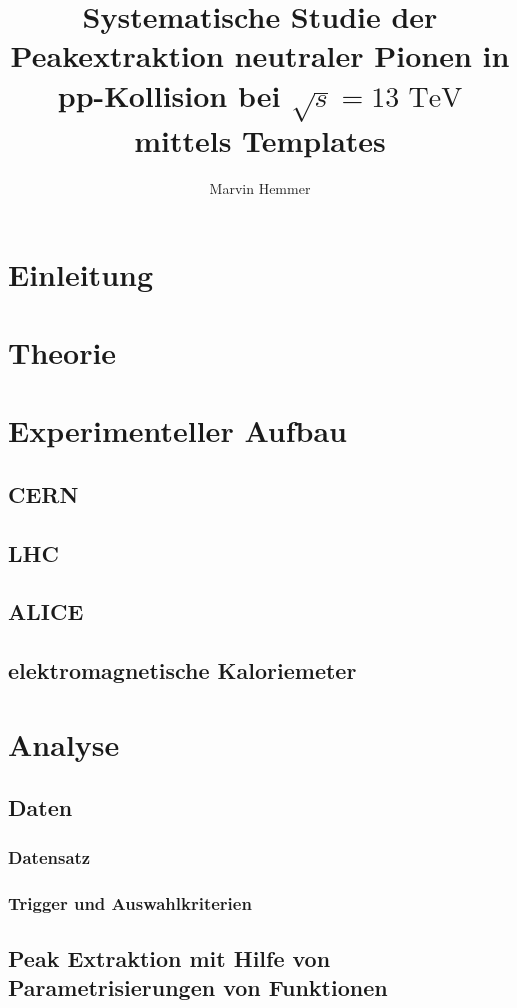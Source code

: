 \documentclass[11pt]{article}
\title{Systematische Studie der Peakextraktion neutraler Pionen in pp-Kollision bei $\sqrt{s}=13\text{ TeV}$ mittels Templates}
\author{Marvin Hemmer}
\begin{document}
\maketitle
\newpage
\tableofcontents
\newpage

	\section*{Einleitung}
	\section{Theorie}

	\section{Experimenteller Aufbau}
	\subsection{CERN}
	\subsection{LHC}
	\subsection{ALICE}
	\subsection{elektromagnetische Kaloriemeter}

	\section{Analyse}
	\subsection{Daten}
	\subsubsection{Datensatz}
	\label{ssec:Datensatz}
	\subsubsection{Trigger und Auswahlkriterien}
	\subsection{Peak Extraktion mit Hilfe von Parametrisierungen von Funktionen}
\end{document}
